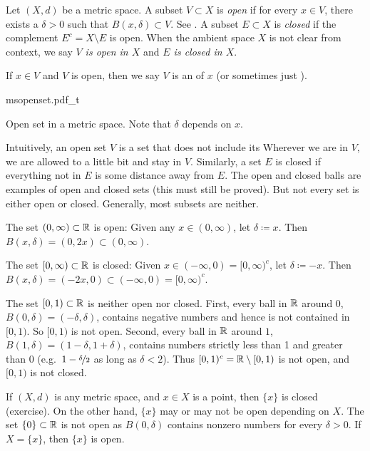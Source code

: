 \begin{defn}
Let $(X,d)$ be a metric space.  A subset $V \subset X$
is \emph{open}
if for every $x \in V$, there exists a $\delta > 0$ such that
$B(x,\delta) \subset V$.  See .  A subset $E \subset X$ is 
\emph{closed} if the complement $E^c = X \setminus E$ is open.
When the ambient space $X$ is not clear from context,
we say \emph{$V$ is open in $X$} and \emph{$E$ is closed in $X$}.

If $x \in V$ and $V$ is open, then we say 
$V$ is an \emph{} of $x$ (or
sometimes just \emph{}).
\end{defn}

\begin{myfigureht}
{msopenset.pdf_t}
\caption{Open set in a metric space.  Note that $\delta$ depends on $x$.\label{fig:msopenset}}
\end{myfigureht}

Intuitively, an open set $V$ is a set that does not include its
Wherever we are in $V$,
we are allowed to  a little bit and
stay in $V$.  Similarly, a set $E$ is closed if everything not in $E$
is some distance away from $E$.
The open and closed balls are examples of open and closed sets
(this must still be proved).
But not every set is either open or closed.  Generally, most subsets are neither.

\begin{example}
The set $(0,\infty) \subset {\mathbb{R}}$ is open:  Given any $x \in (0,\infty)$,
let $\delta \coloneqq x$.  Then $B(x,\delta) = (0,2x) \subset (0,\infty)$.

The set $[0,\infty) \subset {\mathbb{R}}$ is closed:  Given $x \in (-\infty,0) =
[0,\infty)^c$,
let $\delta \coloneqq -x$.  Then $B(x,\delta) = (-2x,0) \subset
(-\infty,0) = [0,\infty)^c$.

The set $[0,1) \subset {\mathbb{R}}$ is neither open nor closed.  First,
every ball in ${\mathbb{R}}$ around $0$, $B(0,\delta) = (-\delta,\delta)$, contains negative
numbers and hence is not contained in $[0,1)$.  So $[0,1)$ is not open.
Second, every ball in ${\mathbb{R}}$ around $1$,
$B(1,\delta) = (1-\delta,1+\delta)$, contains
numbers strictly less than 1 and greater than 0
(e.g.\ $1-\nicefrac{\delta}{2}$ as long as $\delta < 2$).
Thus $[0,1)^c = {\mathbb{R}} \setminus
[0,1)$ is not open, and $[0,1)$ is not closed.

If $(X,d)$ is any metric space, and $x \in X$ is a point, then $\{ x \}$ is
closed (exercise).
On the other hand, $\{ x \}$ may or may not be open depending on $X$.
The set $\{ 0 \} \subset {\mathbb{R}}$ is not open as $B(0,\delta)$
contains nonzero numbers for every $\delta > 0$.
If $X=\{ x \}$, then $\{ x \}$ is open.
\end{example}

